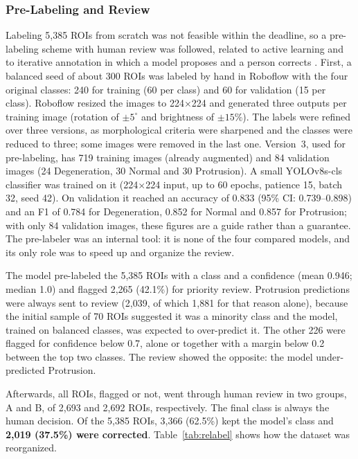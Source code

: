 \subsubsection{Pre-Labeling and Review}
Labeling 5,385 ROIs from scratch was not feasible within the deadline, so a pre-labeling scheme with human review was followed, related to active learning \cite{wang2024al} and to iterative annotation in which a model proposes and a person corrects \cite{vandergraaf2024}. First, a balanced seed of about 300 ROIs was labeled by hand in Roboflow with the four original classes: 240 for training (60 per class) and 60 for validation (15 per class). Roboflow resized the images to 224$\times$224 and generated three outputs per training image (rotation of $\pm 5^{\circ}$ and brightness of $\pm 15\%$). The labels were refined over three versions, as morphological criteria were sharpened and the classes were reduced to three; some images were removed in the last one. Version~3, used for pre-labeling, has 719 training images (already augmented) and 84 validation images (24 Degeneration, 30 Normal and 30 Protrusion). A small YOLOv8s-cls classifier was trained on it (224$\times$224 input, up to 60 epochs, patience 15, batch 32, seed 42). On validation it reached an accuracy of 0.833 (95\% CI: 0.739--0.898) and an F1 of 0.784 for Degeneration, 0.852 for Normal and 0.857 for Protrusion; with only 84 validation images, these figures are a guide rather than a guarantee. The pre-labeler was an internal tool: it is none of the four compared models, and its only role was to speed up and organize the review.

The model pre-labeled the 5,385 ROIs with a class and a confidence (mean 0.946; median 1.0) and flagged 2,265 (42.1\%) for priority review. Protrusion predictions were always sent to review (2,039, of which 1,881 for that reason alone), because the initial sample of 70 ROIs suggested it was a minority class and the model, trained on balanced classes, was expected to over-predict it. The other 226 were flagged for confidence below 0.7, alone or together with a margin below 0.2 between the top two classes. The review showed the opposite: the model under-predicted Protrusion.

Afterwards, all ROIs, flagged or not, went through human review in two groups, A and B, of 2,693 and 2,692 ROIs, respectively. The final class is always the human decision. Of the 5,385 ROIs, 3,366 (62.5\%) kept the model's class and \textbf{2,019 (37.5\%) were corrected}. Table~\ref{tab:relabel} shows how the dataset was reorganized.

